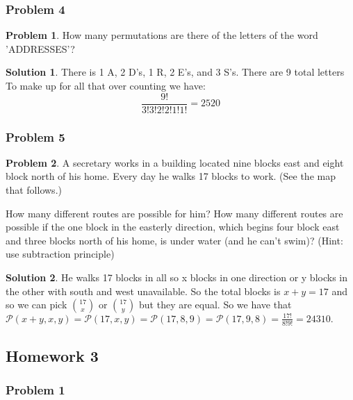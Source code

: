\documentclass[10pt,a4paper,titlepage,twoside,draft]{article}
\theoremstyle{plain}
\theoremstyle{definition}
\newtheorem*{prob}{Problem}
\newtheorem*{sol}{Solution}
\theoremstyle{remark}
\begin{document}
\subsubsection{Problem 4}

\begin{prob}
How many permutations are there of the letters of the word 'ADDRESSES'?
\end{prob}

\medskip

\begin{sol}    
There is 1 A, 2 D's, 1 R, 2 E's, and 3 S's.
There are 9 total letters
To make up for all that over counting we have: \[\frac{9!}{3!3!2!2!1!1!} = 2520\]
\end{sol}

\subsubsection{Problem 5}

\begin{prob}
A secretary works in a building located nine blocks east and eight block north of his home.
Every day he walks 17 blocks to work. (See the map that follows.)


How many different routes are possible for him?
How many different routes are possible if the one block in the easterly direction, which begins four block east and three blocks north of his home,
is under water (and he can't swim)? (Hint: use subtraction principle)
\end{prob}

\medskip

\begin{sol}
He walks 17 blocks in all so x blocks in one direction or y blocks in the other with south and west unavailable. So the total blocks is $x + y = 17$ 
and so we can pick $\binom{17}{x}$ or $\binom{17}{y}$ but they are equal. So we have that $\mathcal{P}(x+y, x, y) = \mathcal{P}(17, x, y) = \mathcal{P}(17, 8, 9) = \mathcal{P}(17, 9, 8) = \frac{17!}{8!9!} = 24310.$
\end{sol}


\pagebreak


\subsection{Homework 3}


\subsubsection{Problem 1}
\end{document}
